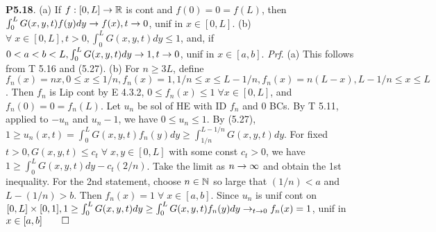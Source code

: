 {\bf P5.18}. (a) If $f: [0,L] \rightarrow \mathbb{R}$ is cont and $f(0) = 0 = f(L)$, then $\int_0^L G(x,y,t) f(y)dy \rightarrow f(x), t \rightarrow 0$, unif in $x \in [0,L]$. (b) $\forall  \; x \in [0,L], t>0, \int_0^L G(x,y,t) dy \leq 1$, and, if $0<a<b<L,  \int_0^L G(x,y,t)dy \rightarrow 1, t \rightarrow 0$, unif in $x \in [a,b]$. {\it Prf}. (a) This follows from T 5.16 and (5.27). (b) For $n \geq 3L$, define $f_n(x)=nx, 0 \leq x \leq 1/n, f_n(x)=1, 1/n \leq x \leq L-1/n, f_n(x)=n(L-x), L-1/n \leq x \leq L$. Then $f_n$ is Lip cont by E 4.3.2, $0 \leq f_n(x) \leq 1 \; \forall x \in [0,L]$, and $f_n(0)=0=f_n(L)$. Let $u_n$ be sol of HE with ID $f_n$ and 0 BCs. By T 5.11, applied to $-u_n$ and $u_n-1$, we have $0 \leq u_n \leq 1$. By (5.27), $1 \geq u_n(x,t) = \int_0^L G(x,y,t)f_n(y)dy \geq \int_{1/n}^{L-1/n} G(x,y,t) dy$. For fixed $t>0, G(x,y,t) \leq c_t \; \forall \; x,y \in [0,L]$ with some const $c_t>0$, we have $1 \geq \int_0^L G(x,y,t) dy - c_t (2/n)$. Take the limit as $n \rightarrow \infty$ and obtain the 1st inequality.  For the 2nd statement, choose $n \in \mathbb{N}$ so large that $(1/n) < a$ and $L - (1/n) > b$. Then $f_n(x)=1 \; \forall \; x \in [a,b]$. Since $u_n$ is unif cont on $[0,L] \times [0,1], 1 \geq \int_0^L G(x,y,t)dy \geq \int_0^L G(x,y,t) f_n(y) dy \rightarrow_{t \rightarrow 0} f_n(x) = 1$, unif in $x \in [a,b] \qed$